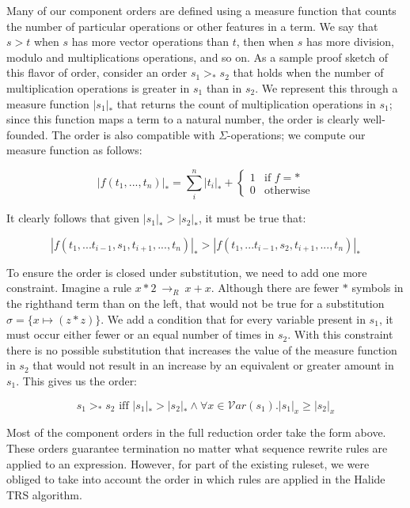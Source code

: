 \documentclass[acmsmall,review]{acmart}\settopmatter{printfolios=true,printccs=false,printacmref=false}
\newcommand{\rewrites}[0]{\:\rightarrow_{R}\:}
\begin{document}
Many of our component orders are defined using a measure function that counts the number of particular operations or other features in a term. We say that $s > t$ when $s$ has more vector operations than $t$, then when $s$ has more division, modulo and multiplications operations, and so on. As a sample proof sketch of this flavor of order, consider an order $s_1 >_* s_2$ that holds when the number of multiplication operations is greater in $s_1$ than in $s_2$. We represent this through a measure function $|s_1|_*$ that returns the count of multiplication operations in $s_1$; since this function maps a term to a natural number, the order is clearly well-founded. The order is also compatible with $\Sigma$-operations; we compute our measure function as follows:


\[
|f(t_1,...,t_n)|_* = \sum_i^n |t_i|_* + \begin{cases} 1 & \textrm{if } f = * \\
                                                      0 & \textrm{otherwise}
                                        \end{cases}
\]

It clearly follows that given $|s_1|_* > |s_2|_*$, it must be true that:

\[
|f(t_1,...t_{i-1},s_1,t_{i+1},...,t_n)|_* > |f(t_1,...t_{i-1},s_2,t_{i+1},...,t_n)|_*
\]

To ensure the order is closed under substitution, we need to add one more constraint. Imagine a rule $x * 2 \rewrites x + x$. Although there are fewer $*$ symbols in the righthand term than on the left, that would not be true for a substitution $\sigma = \{x \mapsto (z * z)\}$. We add a condition that for every variable present in $s_1$, it must occur either fewer or an equal number of times in $s_2$. With this constraint there is no possible substitution that increases the value of the measure function in $s_2$ that would not result in an increase by an equivalent or greater amount in $s_1$. This gives us the order:

\[
s_1 >_* s_2 \textrm{ iff } |s_1|_* > |s_2|_* \wedge \forall x \in \mathcal{V}ar(s_1) . |s_1|_x \geq |s_2|_x
\]

Most of the component orders in the full reduction order take the form above. These orders guarantee termination no matter what sequence rewrite rules are applied to an expression. However, for part of the existing ruleset, we were obliged to take into account the order in which rules are applied in the Halide TRS algorithm.
\end{document}
